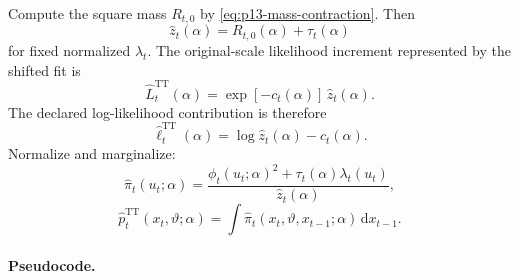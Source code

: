 \documentclass[11pt]{article}
\newcommand{\dd}{\mathrm{d}}
\newcommand{\TT}{\mathrm{TT}}
\theoremstyle{definition}
\theoremstyle{remark}
\begin{document}
Compute the square mass \(R_{t,0}\) by \eqref{eq:p13-mass-contraction}.  Then
\[
  \widehat z_t(\alpha)=R_{t,0}(\alpha)+\tau_t(\alpha)
\]
for fixed normalized \(\lambda_t\).  The original-scale likelihood increment
represented by the shifted fit is
\[
  \widehat L_t^{\TT}(\alpha)
  =
  \exp[-c_t(\alpha)]\,\widehat z_t(\alpha).
\]
The declared log-likelihood contribution is therefore
\[
  \widehat\ell_t^{\TT}(\alpha)
  =
  \log\widehat z_t(\alpha)-c_t(\alpha).
  \label{eq:p13-declared-step-scalar}
\]
Normalize and marginalize:
\[
  \widehat\pi_t(u_t;\alpha)
  =
  \frac{\phi_t(u_t;\alpha)^2+\tau_t(\alpha)\lambda_t(u_t)}
       {\widehat z_t(\alpha)},
\]
\[
  \widehat p_t^{\TT}(x_t,\vartheta;\alpha)
  =
  \int \widehat\pi_t(x_t,\vartheta,x_{t-1};\alpha)\,\dd x_{t-1}.
  \label{eq:p13-fixed-filter-output}
\]

\paragraph{Pseudocode.}
\end{document}
